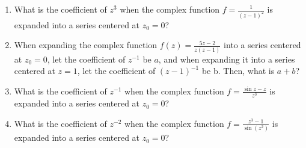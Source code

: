 \documentclass{article}
\newcommand{\inv}[1]{#1^{-1}}
\theoremstyle{definition}
\begin{document}
\begin{tcolorbox}[colback=white,colframe=white,arc=5pt,title={\color{black}\bf $\bullet$ Series Expansion of a Complex Function I}]
	\begin{enumerate}[(1)]
		\item What is the coefficient of $z^3$ when the complex function $\displaystyle f=\frac{1}{(z-1)^2}$ is expanded into a series centered at $z_0=0$?
		\item When expanding the complex function $\displaystyle f(z)=\frac{5z-2}{z(z-1)}$ into a series centered at $z_0=0$, let the coefficient of $\inv{z}$ be $a$, and when expanding it into a series centered at $z=1$, let the coefficient of $(z-1)^{-1}$ be b. Then, what is $a+b$?
		\item What is the coefficient of $z^{-1}$ when the complex function $\displaystyle f=\frac{\sin z-z}{z^3}$ is expanded into a series centered at $z_0=0$?
		\item What is the coefficient of $z^{-2}$ when the complex function $\displaystyle f=\frac{z^3-1}{\sin(z^2)}$ is expanded into a series centered at $z_0=0$?
	\end{enumerate}
\end{tcolorbox}
\end{document}
